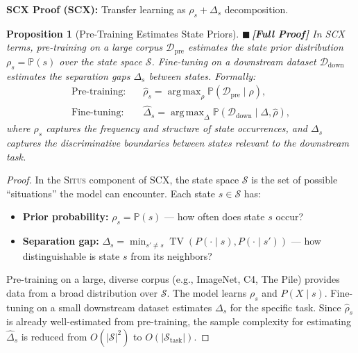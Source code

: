 \documentclass[12pt,a4paper]{article}
\newtheorem{proposition}[theorem]{Proposition}
\theoremstyle{definition}
\newcommand{\rigorFull}{{\color{rigorcolor}$\blacksquare$\,\textbf{[Full Proof]}}}
\newcommand{\Situs}{\textsc{Situs}}
\newcommand{\SCX}{\textsc{SCX}}
\DeclareMathOperator*{\argmax}{arg\,max}
\DeclareMathOperator{\TV}{TV}
\newcommand{\Pbb}{\mathbb{P}}
\newcommand{\cD}{\mathcal{D}}
\newcommand{\cS}{\mathcal{S}}
\newcommand{\scxProof}{\noindent\textbf{SCX Proof (SCX):} }
\begin{document}
\scxProof{} Transfer learning as $\rho_s + \Delta_s$ decomposition.

\begin{proposition}[Pre-Training Estimates State Priors]\label{prop:pretrain_prior}
\rigorFull
In \SCX{} terms, pre-training on a large corpus $\cD_{\text{pre}}$ estimates the state prior distribution $\rho_s = \Pbb(s)$ over the state space $\cS$. Fine-tuning on a downstream dataset $\cD_{\text{down}}$ estimates the separation gaps $\Delta_s$ between states. Formally:
\begin{align}
    \text{Pre-training:}\quad &\hat{\rho}_s = \argmax_{\rho} \Pbb(\cD_{\text{pre}} \mid \rho), \label{eq:pretrain} \\
    \text{Fine-tuning:}\quad &\hat{\Delta}_s = \argmax_{\Delta} \Pbb(\cD_{\text{down}} \mid \Delta, \hat{\rho}), \label{eq:finetune}
\end{align}
where $\rho_s$ captures the frequency and structure of state occurrences, and $\Delta_s$ captures the discriminative boundaries between states relevant to the downstream task.
\end{proposition}

\begin{proof}
In the \Situs{} component of \SCX{}, the state space $\cS$ is the set of possible ``situations'' the model can encounter. Each state $s \in \cS$ has:
\begin{itemize}[nosep]
    \item \textbf{Prior probability:} $\rho_s = \Pbb(s)$ — how often does state $s$ occur?
    \item \textbf{Separation gap:} $\Delta_s = \min_{s' \neq s} \TV(P(\cdot \mid s), P(\cdot \mid s'))$ — how distinguishable is state $s$ from its neighbors?
\end{itemize}

Pre-training on a large, diverse corpus (e.g., ImageNet, C4, The Pile) provides data from a broad distribution over $\cS$. The model learns $\rho_s$ and $P(X \mid s)$. Fine-tuning on a small downstream dataset estimates $\Delta_s$ for the specific task. Since $\hat{\rho}_s$ is already well-estimated from pre-training, the sample complexity for estimating $\hat{\Delta}_s$ is reduced from $O(|\cS|^2)$ to $O(|\cS_{\text{task}}|)$.
\end{proof}
\end{document}

